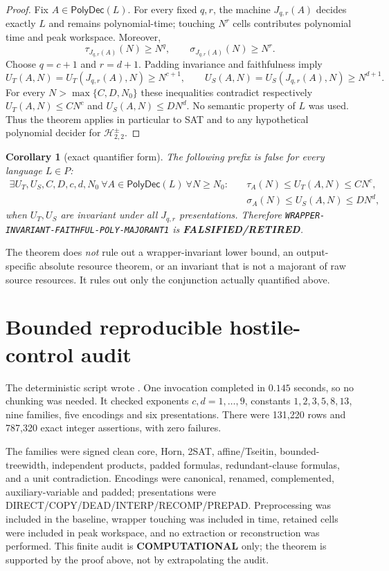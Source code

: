\documentclass[11pt]{article}
\newtheorem{corollary}{Corollary}
\newcommand{\COMP}{\textbf{COMPUTATIONAL}}
\newcommand{\RETIRED}{\textbf{FALSIFIED/RETIRED}}
\begin{document}
\begin{proof}
Fix $A\in\mathsf{PolyDec}(L)$.  For every fixed $q,r$, the machine
$J_{q,r}(A)$ decides exactly $L$ and remains polynomial-time; touching
$N^r$ cells contributes polynomial time and peak workspace.  Moreover,
\[
 \tau_{J_{q,r}(A)}(N)\ge N^q,
 \qquad
 \sigma_{J_{q,r}(A)}(N)\ge N^r.
\]
Choose $q=c+1$ and $r=d+1$.  Padding invariance and faithfulness imply
\[
 U_T(A,N)=U_T(J_{q,r}(A),N)\ge N^{c+1},\qquad
 U_S(A,N)=U_S(J_{q,r}(A),N)\ge N^{d+1}.
\]
For every $N>\max\{C,D,N_0\}$ these inequalities contradict respectively
$U_T(A,N)\le C N^c$ and $U_S(A,N)\le D N^d$.  No semantic property of $L$
was used.  Thus the theorem applies in particular to SAT and to any
hypothetical polynomial decider for $\mathcal H^{\pm}_{2,2}$.
\end{proof}

\begin{corollary}[exact quantifier form]
The following prefix is false for every language $L\in P$:
\[
\begin{split}
\exists U_T,U_S,C,D,c,d,N_0\ \forall A\in\mathsf{PolyDec}(L)\
\forall N\ge N_0:\quad
&\tau_A(N)\le U_T(A,N)\le C N^c,\\
&\sigma_A(N)\le U_S(A,N)\le D N^d,
\end{split}
\]
when $U_T,U_S$ are invariant under all $J_{q,r}$ presentations.  Therefore
\texttt{WRAPPER-INVARIANT-FAITHFUL-POLY-MAJORANT1} is \RETIRED.
\end{corollary}

The theorem does \emph{not} rule out a wrapper-invariant lower bound, an
output-specific absolute resource theorem, or an invariant that is not a
majorant of raw source resources.  It rules out only the conjunction actually
quantified above.

\section{Bounded reproducible hostile-control audit}

The deterministic script
wrote
.
One invocation completed in $0.145$ seconds, so no chunking was needed.  It
checked exponents $c,d=1,\ldots,9$, constants
$1,2,3,5,8,13$, nine families, five encodings and six presentations.  There
were 131,220 rows and 787,320 exact integer assertions, with zero failures.

The families were signed clean core, Horn, 2SAT, affine/Tseitin,
bounded-treewidth, independent products, padded formulas, redundant-clause
formulas, and a unit contradiction.  Encodings were canonical, renamed,
complemented, auxiliary-variable and padded; presentations were
DIRECT/COPY/DEAD/INTERP/RECOMP/PREPAD.  Preprocessing was included in the
baseline, wrapper touching was included in time, retained cells were included
in peak workspace, and no extraction or reconstruction was performed.  This
finite audit is \COMP{} only; the theorem is supported by the proof above, not
by extrapolating the audit.
\end{document}
